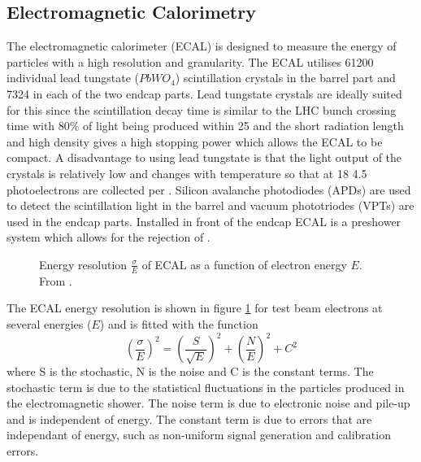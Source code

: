 \subsection{Electromagnetic Calorimetry}
The electromagnetic calorimeter (ECAL) is designed to measure the energy of
particles with a high resolution and granularity.
The ECAL utilises 61200 individual lead tungstate ($PbWO_{4}$) scintillation
crystals in the barrel part and 7324 
in each of the two endcap parts. 
Lead tungstate crystals are ideally suited for this since the scintillation
decay time is similar to the LHC 
bunch crossing time with \unit{80}{\%} of light being produced within
\unit{25}{\nano\second} and the short 
radiation length and high density gives a high stopping power which allows the
ECAL to be compact.
A disadvantage to using lead tungstate is that the light output of the crystals
is relatively low and changes 
with temperature so that at \unit{18}{\celsius} 4.5 photoelectrons are
collected per \MeV.
Silicon avalanche photodiodes (APDs) are used to detect the scintillation light
in the barrel and vacuum 
phototriodes (VPTs) are used in the endcap parts.
Installed in front of the endcap ECAL is a preshower system which allows for
the rejection of \Ppizero .\cite{cms}

\begin{figure}[htb!]
  \centering
  \caption{Energy resolution $\frac{\sigma}{E}$ of ECAL as a function of
  \label{fig:ECAL}
electron energy $E$. From \cite{cms}.}
\end{figure}

The ECAL energy resolution is shown in figure \ref{fig:ECAL} for test beam
electrons at several energies ($E$) and is fitted with the function
\begin{equation}
\left(\frac{\sigma}{E}\right)^{2} = \left(\frac{S}{\sqrt{E}}\right)^{2} +
\left(\frac{N}{E}\right)^{2} + C^{2}
\end{equation}
where S is the stochastic, N is the noise and C is the constant terms. The
stochastic term is due to the statistical fluctuations in the particles
produced in the electromagnetic shower. The noise term is due to electronic
noise and pile-up and is independent of energy. The constant term is due to
errors that are independant of energy, such as non-uniform signal generation
and calibration errors.\cite{cms}



